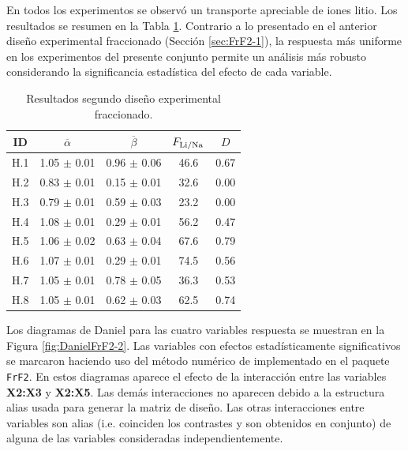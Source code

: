 En todos los experimentos se observó un transporte apreciable de iones litio. Los resultados se resumen en la Tabla \ref{tab:frf2results2}. Contrario a lo presentado en el anterior diseño experimental fraccionado (Sección \ref{sec:FrF2-1}), la respuesta más uniforme en los experimentos del presente conjunto permite un análisis más robusto considerando la significancia estadística del efecto de cada variable. 
\begin{table}[H]
    \centering\footnotesize
    \begin{tabular}{@{}ccccc@{}}\toprule
        \textbf{ID} & $\overline{\alpha}$ & $\overline{\beta}$ & $F_{\ce{Li}/\ce{Na}}$&$D$\\\midrule
        H.1 & 1.05 $\pm$ 0.01   & 0.96 $\pm$ 0.06   & 46.6 &0.67\\
        H.2 & 0.83 $\pm$ 0.01   & 0.15 $\pm$ 0.01   & 32.6 &0.00\\
        H.3 & 0.79 $\pm$ 0.01   & 0.59 $\pm$ 0.03   & 23.2 &0.00\\
        H.4 & 1.08 $\pm$ 0.01   & 0.29 $\pm$ 0.01   & 56.2 &0.47\\
        H.5 & 1.06 $\pm$ 0.02   & 0.63 $\pm$ 0.04   & 67.6 &0.79\\
        H.6 & 1.07 $\pm$ 0.01   & 0.29 $\pm$ 0.01   & 74.5 &0.56\\
        H.7 & 1.05 $\pm$ 0.01   & 0.78 $\pm$ 0.05   & 36.3 &0.53\\
        H.8 & 1.05 $\pm$ 0.01   & 0.62 $\pm$ 0.03   & 62.5 &0.74\\\bottomrule
    \end{tabular}
    \caption{Resultados segundo diseño experimental fraccionado.}
    \label{tab:frf2results2}
\end{table}

Los diagramas de Daniel para las cuatro variables respuesta se muestran en la Figura \ref{fig:DanielFrF2-2}. Las variables con efectos estadísticamente significativos se marcaron haciendo uso del método numé\-rico de \citet{Lenth1989} implementado en el paquete \verb|FrF2|. En estos diagramas aparece el efecto de la interacción entre las variables \textbf{X2:X3} y \textbf{X2:X5}. Las demás interacciones no aparecen debido a la estructura alias usada para generar la matriz de diseño. Las otras interacciones entre variables son alias (i.e. coinciden los contrastes y son obtenidos en conjunto) de alguna de las variables consideradas independientemente.

